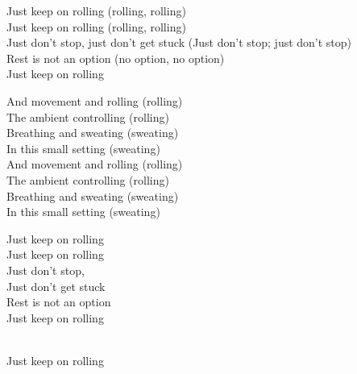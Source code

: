 \begin{lyrics}
Just keep on rolling (rolling, rolling)\\
Just keep on rolling (rolling, rolling)\\
Just don't stop, just don't get stuck
(Just don't stop; just don't stop)\\
Rest is not an option (no option, no option)\\
Just keep on rolling

And movement and rolling (rolling)\\
The ambient controlling (rolling)\\
Breathing and sweating (sweating)\\
In this small setting (sweating)\\
And movement and rolling (rolling)\\
The ambient controlling (rolling)\\
Breathing and sweating (sweating)\\
In this small setting (sweating)

Just keep on rolling\\
Just keep on rolling\\
Just don't stop,\\
Just don't get stuck\\
Rest is not an option\\
Just keep on rolling

\\
Just keep on rolling
\end{lyrics}


